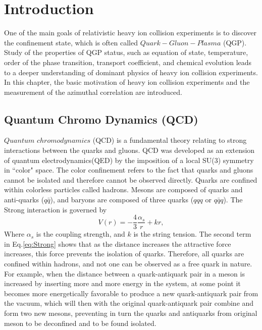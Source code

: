 

\chapter{Introduction}

One of the main goals of relativistic heavy ion collision experiments is to discover the confinement state, which is often called $Quark- Gluon- Plasma$ (QGP). Study of the properties of QGP status, such as equation of state, temperature, order of the phase transition, transport coefficient, and chemical evolution leads to a deeper understanding of dominant physics of heavy ion collision experiments. In this chapter, the basic motivation of heavy ion collision experiments and the measurement of the azimuthal correlation are introduced. 


\section{Quantum Chromo Dynamics (QCD)}

$Quantum$ $chromodynamics$ (QCD) is a fundamental theory relating to strong interactions between the quarks and gluons. QCD was developed as an extension of quantum electrodynamics(QED) by the imposition of a local SU(3) symmetry in ``color" space. The color confinement refers to the fact that quarks and gluons cannot be isolated and therefore cannot be observed directly. Quarks are confined within colorless particles called hadrons. Mesons are composed of quarks and anti-quarks ($q\bar{q}$), and baryons are composed of three quarks ($qqq$ or $\bar{qqq}$). The Strong interaction is governed by 
\begin{equation}
	V(r) = - \frac{4}{3} \frac{\alpha_s}{r} + kr,
	\label{eq:Strong}
\end{equation}
Where $\alpha_s$ is the coupling strength, and $k$ is the string tension. The second term in Eq.\ref{eq:Strong} shows that as the distance increases the attractive force increases, this force prevents the isolation of quarks. Therefore, all quarks are confined within hadrons, and not one can be observed as a free quark in nature. For example, when the distance between a quark-antiquark pair in a meson is increased by inserting more and more energy in the system, at some point it becomes more energetically favorable to produce a new quark-antiquark pair from the vacuum, which will then with the original quark-antiquark pair combine and form two new mesons, preventing in turn the quarks and antiquarks from original meson to be deconfined and to be found isolated.

